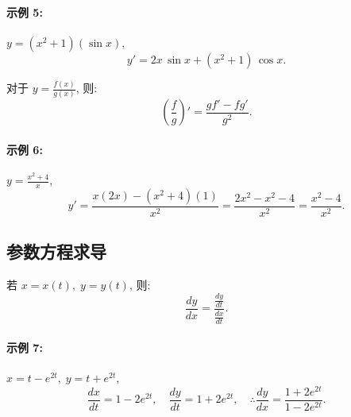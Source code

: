 \documentclass[8pt,a4paper,twoside]{tau-class/tau}
\begin{document}
\paragraph{示例 5:} $y = (x^2 + 1)(\sin x)$,
\[
    y' = 2x\,\sin x + (x^2 + 1)\,\cos x.
\]

对于 $y = \tfrac{f(x)}{g(x)}$, 则:
\[
    \left(\frac{f}{g}\right)' = \frac{g f' − f g'}{g^2}.
\]
\paragraph{示例 6:} $y = \tfrac{x^2 + 4}{x}$,
\[
    y' = \frac{x(2x) − (x^2 + 4)(1)}{x^2} = \frac{2x^2 − x^2 − 4}{x^2} = \frac{x^2 − 4}{x^2}.
\]

\subsection{参数方程求导}
若 $x = x(t), \; y = y(t)$, 则:
\[
    \frac{dy}{dx} = \frac{\frac{dy}{dt}}{\frac{dx}{dt}}.
\]
\paragraph{示例 7:} $x = t − e^{2t}, \; y = t + e^{2t}$,
\[
    \frac{dx}{dt} = 1 − 2e^{2t}, \quad \frac{dy}{dt} = 1 + 2e^{2t}, \quad \therefore \frac{dy}{dx} = \frac{1 + 2e^{2t}}{1 − 2e^{2t}}.
\]
\end{document}
